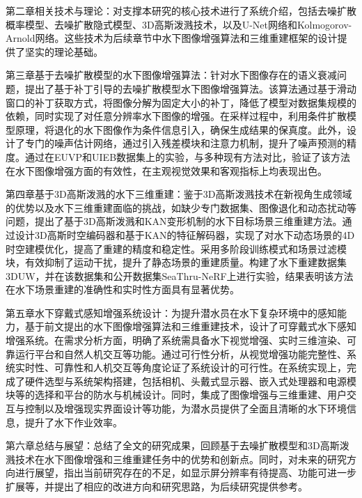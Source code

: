 第二章相关技术与理论：对支撑本研究的核心技术进行了系统介绍，包括去噪扩散概率模型、去噪扩散隐式模型、3D高斯泼溅技术，以及U-Net网络和Kolmogorov-Arnold网络。这些技术为后续章节中水下图像增强算法和三维重建框架的设计提供了坚实的理论基础。

第三章基于去噪扩散模型的水下图像增强算法：针对水下图像存在的语义衰减问题，提出了基于补丁引导的去噪扩散模型水下图像增强算法。该算法通过基于滑动窗口的补丁获取方式，将图像分解为固定大小的补丁，降低了模型对数据集规模的依赖，同时实现了对任意分辨率水下图像的增强。在采样过程中，利用条件扩散模型原理，将退化的水下图像作为条件信息引入，确保生成结果的保真度。此外，设计了专门的噪声估计网络，通过引入残差模块和注意力机制，提升了噪声预测的精度。通过在EUVP和UIEB数据集上的实验，与多种现有方法对比，验证了该方法在水下图像增强方面的有效性，在主观视觉效果和客观指标上均表现出色。

第四章基于3D高斯泼溅的水下三维重建：鉴于3D高斯泼溅技术在新视角生成领域的优势以及水下三维重建面临的挑战，如缺少专门数据集、图像退化和动态扰动等问题，提出了基于3D高斯泼溅和KAN变形机制的水下目标场景三维重建方法。通过设计3D高斯时空编码器和基于KAN的特征解码器，实现了对水下动态场景的4D时空建模优化，提高了重建的精度和稳定性。采用多阶段训练模式和场景过滤模块，有效抑制了运动干扰，提升了静态场景的重建质量。构建了水下重建数据集3DUW，并在该数据集和公开数据集SeaThru-NeRF上进行实验，结果表明该方法在水下场景重建的准确性和实时性方面具有显著优势。

第五章水下穿戴式感知增强系统设计：为提升潜水员在水下复杂环境中的感知能力，基于前文提出的水下图像增强算法和三维重建技术，设计了可穿戴式水下感知增强系统。在需求分析方面，明确了系统需具备水下视觉增强、实时三维渲染、可靠运行平台和自然人机交互等功能。通过可行性分析，从视觉增强功能完整性、系统实时性、可靠性和人机交互等角度论证了系统设计的可行性。在系统实现上，完成了硬件选型与系统架构搭建，包括相机、头戴式显示器、嵌入式处理器和电源模块等的选择和平台的防水与机械设计。同时，集成了图像增强与三维重建、用户交互与控制以及增强现实界面设计等功能，为潜水员提供了全面且清晰的水下环境信息，提升了水下作业效率。

第六章总结与展望：总结了全文的研究成果，回顾基于去噪扩散模型和3D高斯泼溅技术在水下图像增强和三维重建任务中的优势和创新点。同时，对未来的研究方向进行展望，指出当前研究存在的不足，如显示屏分辨率有待提高、功能可进一步扩展等，并提出了相应的改进方向和研究思路，为后续研究提供参考。 
